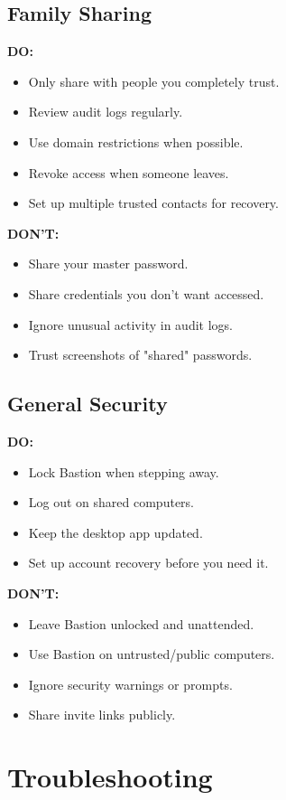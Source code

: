 \documentclass[11pt,a4paper]{article}
\begin{document}
\subsection{Family Sharing}
\textbf{DO:}
\begin{itemize}
    \item Only share with people you completely trust.
    \item Review audit logs regularly.
    \item Use domain restrictions when possible.
    \item Revoke access when someone leaves.
    \item Set up multiple trusted contacts for recovery.
\end{itemize}

\textbf{DON'T:}
\begin{itemize}
    \item Share your master password.
    \item Share credentials you don't want accessed.
    \item Ignore unusual activity in audit logs.
    \item Trust screenshots of "shared" passwords.
\end{itemize}

\subsection{General Security}
\textbf{DO:}
\begin{itemize}
    \item Lock Bastion when stepping away.
    \item Log out on shared computers.
    \item Keep the desktop app updated.
    \item Set up account recovery before you need it.
\end{itemize}

\textbf{DON'T:}
\begin{itemize}
    \item Leave Bastion unlocked and unattended.
    \item Use Bastion on untrusted/public computers.
    \item Ignore security warnings or prompts.
    \item Share invite links publicly.
\end{itemize}

\section{Troubleshooting}
\end{document}

